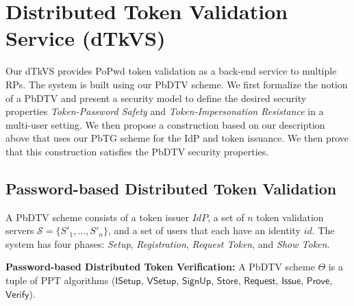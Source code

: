 \documentclass[conference]{IEEEtran}
\newcommand{\secparameter}{\kappa}
\newcommand{\uid}{id}
\begin{document}

\section{Distributed Token Validation Service (dTkVS)}
\label{sec:PbDTV}
Our dTkVS provides PoPwd token validation as a back-end service to multiple RPs. The system is built using our PbDTV scheme. We first formalize the notion of a PbDTV and present a security model to define the desired security properties {\em Token-Password Safety} and {\em Token-Impersonation Resistance} in a multi-user setting. We then propose a construction based on our description above that uses our PbTG scheme for the IdP and token issuance. We then prove that this construction satisfies the PbDTV security properties.


\subsection{Password-based Distributed Token Validation}
\noindent
A PbDTV scheme consists of a token issuer  $IdP$, a set of $n$ token validation servers $\mathcal{S} = \{S'_1,...,S'_n\}$, and a set of users that each have an identity $\uid$. The system has four phases: {\em Setup}, {\em Registration}, {\em Request Token}, 
and {\em Show Token}.

\vspace{1mm}
\noindent
{\bf Password-based Distributed Token Verification:} A PbDTV scheme $\Theta$ is a tuple of PPT algorithms ($\mathsf{ISetup}$, $\mathsf{VSetup}$, $\mathsf{SignUp}$, $\mathsf{Store}$, $\mathsf{Request}$, $\mathsf{Issue}$, $\mathsf{Prove}$, $\mathsf{Verify}$).
\end{document}

